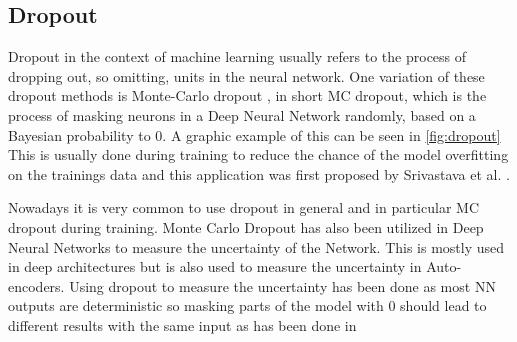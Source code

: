 \subsection{Dropout}
Dropout in the context of machine learning usually refers to the process of dropping out, so omitting, units in the neural network. 
One variation of these dropout methods is Monte-Carlo dropout \cite{gal2016dropoutbayesianapproximationrepresenting}, in short MC dropout, which is the process of masking neurons in a Deep Neural Network randomly, based on a Bayesian probability to 0. A graphic example of this can be seen in \autoref{fig:dropout}
This is usually done during training to reduce the chance of the model overfitting on the trainings data and this application was first proposed by Srivastava et al. \cite{JMLR:v15:srivastava14a}. 

Nowadays it is very common to use dropout in general and in particular MC dropout during training.
Monte Carlo Dropout has also been utilized in Deep Neural Networks to measure the uncertainty of the Network.   
This is mostly used in deep architectures but is also used to measure the uncertainty in Auto-encoders. \cite{gawlikowski2022surveyuncertaintydeepneural}
Using dropout to measure the uncertainty has been done as most NN outputs are deterministic so masking parts of the model with 0 should lead to different results with the same input as has been done in \cite{gal2016dropoutbayesianapproximationrepresenting}

